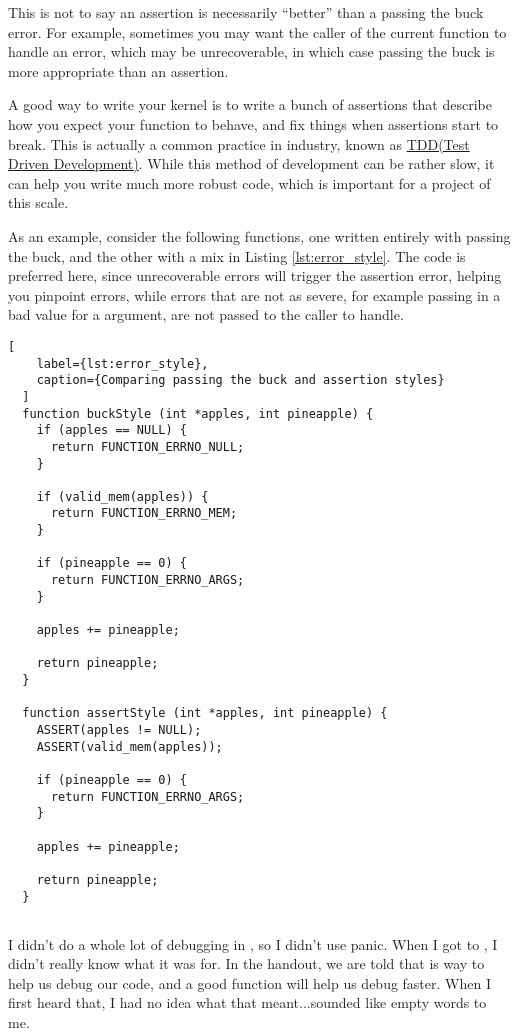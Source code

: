 \documentclass{article}
\begin{document}
This is not to say an assertion is necessarily ``better'' than a passing the
buck error. For example, sometimes you may want the caller of the current
function to handle an error, which may be unrecoverable, in which case 
passing the buck is more appropriate than an assertion.

A good way to write your kernel is to write a bunch of assertions that
describe how you expect your function to behave, and fix things when
assertions start to break. This is actually a common practice in industry,
known as 
\href{https://en.wikipedia.org/wiki/Test-driven_development}
{TDD(Test Driven Development)}.
While this method of development can be rather slow, it can help you write
much more robust code, which is important for a project of this scale.

As an example, consider the following functions, one written entirely with
passing the buck, and the other with a mix in Listing \ref{lst:error_style}.
The  code is preferred here, since unrecoverable errors will
trigger the assertion error, helping you pinpoint errors, while errors that
are not as severe, for example passing in a bad value for a argument, are not
passed to the caller to handle.

\begin{lstlisting}[
    label={lst:error_style}, 
    caption={Comparing passing the buck and assertion styles}
  ]
  function buckStyle (int *apples, int pineapple) {
    if (apples == NULL) {
      return FUNCTION_ERRNO_NULL;
    }

    if (valid_mem(apples)) {
      return FUNCTION_ERRNO_MEM;
    }

    if (pineapple == 0) {
      return FUNCTION_ERRNO_ARGS;
    }

    apples += pineapple;

    return pineapple;
  }

  function assertStyle (int *apples, int pineapple) {
    ASSERT(apples != NULL);
    ASSERT(valid_mem(apples));

    if (pineapple == 0) {
      return FUNCTION_ERRNO_ARGS;
    }

    apples += pineapple;

    return pineapple;
  }
\end{lstlisting}

\subsection{}
I didn't do a whole lot of debugging in , so I didn't use panic. When
I got to , I didn't really know what it was for. In the handout, we
are told that  is way to help us debug our code, and a good
 function will help us debug faster. When I first heard that, I had
no idea what that meant...sounded like empty words to me.
\end{document}
